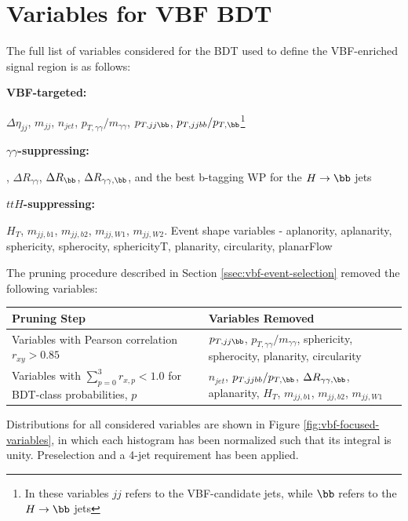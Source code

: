 \section{Variables for VBF BDT} \label{app:vbf-variables}

The full list of variables considered for the BDT used to define the VBF-enriched signal region is as follows:

\textbf{VBF-targeted:}

$\Delta \eta_{jj}$, $m_{jj}$, $n_{jet}$, $p_{T, \gamma\gamma}/m_{\gamma\gamma}$, $p_{T,jj\bb}$, $p_{T,jjbb}/p_{T,\bb}$\footnote{In these variables $jj$ refers to the VBF-candidate jets, while $\bb$ refers to the $H\rightarrow \bb$ jets}

\textbf{$\gamma \gamma$-suppressing:}

\myybb, $\Delta R_{\gamma\gamma}$, $\Delta R_{\bb}$, $\Delta R_{\gamma \gamma,\bb}$, and the best b-tagging WP for the $H\rightarrow \bb$ jets

\textbf{$ttH$-suppressing:}

$H_{T}$, $m_{jj,b1}$, $m_{jj,b2}$, $m_{jj,W1}$, $m_{jj,W2}$. Event shape variables \cite{STDM-2011-33} - aplanority, aplanarity, sphericity, spherocity, sphericityT, planarity, circularity, planarFlow

The pruning procedure described in Section \ref{ssec:vbf-event-selection} removed the following variables:

\begin{center}
  \begin{table}[h]
	  \begin{tabularx}{\textwidth}{Y|Y}
	    \hline
	    Pruning Step & Variables Removed  \\
	    \hline
      Variables with Pearson correlation $r_{xy} > 0.85$  &  $p_{T,jj\bb}$, $p_{T, \gamma\gamma}/m_{\gamma\gamma}$, sphericity, spherocity, planarity, circularity \\
      \hline
	    Variables with $\sum\limits_{p=0}^{3} r_{x,p} < 1.0$ for BDT-class probabilities, $p$ &  $n_{jet}$, $p_{T,jjbb}/p_{T,\bb}$, $\Delta R_{\gamma \gamma,\bb}$, aplanarity, $H_{T}$, $m_{jj,b1}$, $m_{jj,b2}$, $m_{jj,W1}$ \\
	    \hline
    \end{tabularx}
  \end{table}
\end{center}



Distributions for all considered variables are shown in Figure \ref{fig:vbf-focused-variables}, in which each histogram has been normalized such that its integral is unity. Preselection and a 4-jet requirement has been applied.

